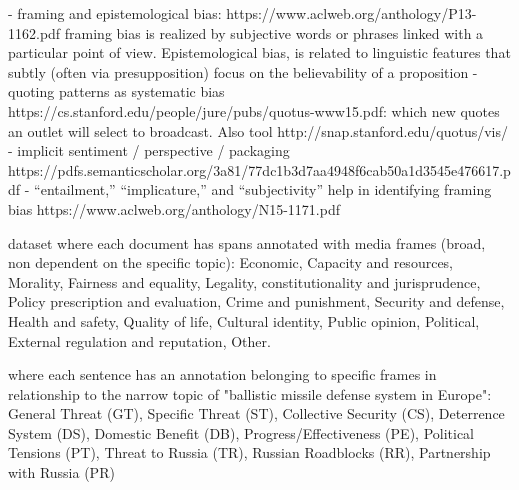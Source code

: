 - framing and epistemological bias: https://www.aclweb.org/anthology/P13-1162.pdf framing bias is realized by subjective words or phrases linked with a particular point of view. Epistemological bias, is related to linguistic features that subtly (often via presupposition) focus on the believability of a proposition
- quoting patterns as systematic bias https://cs.stanford.edu/people/jure/pubs/quotus-www15.pdf: which new quotes an outlet will select to broadcast. Also tool http://snap.stanford.edu/quotus/vis/
- implicit sentiment / perspective / packaging https://pdfs.semanticscholar.org/3a81/77dc1b3d7aa4948f6cab50a1d3545e476617.pdf
- “entailment,” “implicature,” and “subjectivity” help in identifying framing bias https://www.aclweb.org/anthology/N15-1171.pdf


\cite{card2015media} dataset where each document has spans annotated with media frames (broad, non dependent on the specific topic): Economic, Capacity and resources, Morality, Fairness and equality, Legality, constitutionality and jurisprudence, Policy prescription and evaluation, Crime and punishment, Security and defense, Health and safety, Quality of life, Cultural identity, Public opinion, Political, External regulation and reputation, Other.

\cite{morstatter2018identifying} where each sentence has an annotation belonging to specific frames in relationship to the narrow topic of "ballistic missile defense system in Europe": General Threat (GT), Specific Threat (ST), Collective Security (CS), Deterrence System (DS), Domestic Benefit (DB), Progress/Effectiveness (PE), Political Tensions (PT), Threat to Russia (TR), Russian Roadblocks (RR), Partnership with Russia (PR)





